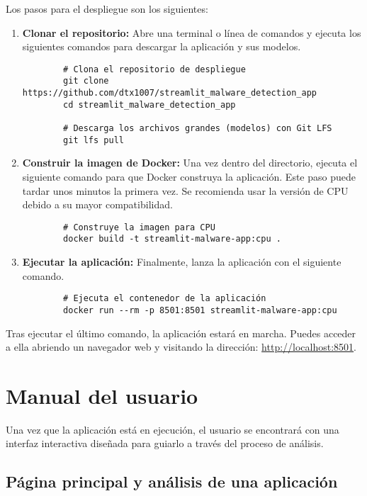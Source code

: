 Los pasos para el despliegue son los siguientes:

\begin{enumerate}
	\item \textbf{Clonar el repositorio:} Abre una terminal o línea de comandos y ejecuta los siguientes comandos para descargar la aplicación y sus modelos.
	\begin{verbatim}
		# Clona el repositorio de despliegue
		git clone https://github.com/dtx1007/streamlit_malware_detection_app
		cd streamlit_malware_detection_app
		
		# Descarga los archivos grandes (modelos) con Git LFS
		git lfs pull
	\end{verbatim}
	
	\item \textbf{Construir la imagen de Docker:} Una vez dentro del directorio, ejecuta el siguiente comando para que Docker construya la aplicación. Este paso puede tardar unos minutos la primera vez. Se recomienda usar la versión de CPU debido a su mayor compatibilidad.
	\begin{verbatim}
		# Construye la imagen para CPU
		docker build -t streamlit-malware-app:cpu .
	\end{verbatim}
	
	\item \textbf{Ejecutar la aplicación:} Finalmente, lanza la aplicación con el siguiente comando.
	\begin{verbatim}
		# Ejecuta el contenedor de la aplicación
		docker run --rm -p 8501:8501 streamlit-malware-app:cpu
	\end{verbatim}
\end{enumerate}

Tras ejecutar el último comando, la aplicación estará en marcha. Puedes acceder a ella abriendo un navegador web y visitando la dirección: \url{http://localhost:8501}.

\section{Manual del usuario}

Una vez que la aplicación está en ejecución, el usuario se encontrará con una interfaz interactiva diseñada para guiarlo a través del proceso de análisis.

\subsection{Página principal y análisis de una aplicación}

